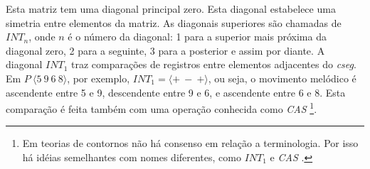 \documentclass[brazil]{article}
\newcommand{\termo}[1]{\textit{#1}}
\begin{document}
\begin{table}
  \centering
  \qquad
  \qquad
  \caption{Exemplos de \termo{COM-matrix}}
  \label{tab:matriz-exemplos}
\end{table}

Esta matriz tem uma diagonal principal zero. Esta diagonal estabelece
uma simetria entre elementos da matriz. As diagonais superiores são
chamadas de $INT_n$, onde $n$ é o número da diagonal: 1 para a
superior mais próxima da diagonal zero, 2 para a seguinte, 3 para a
posterior e assim por diante. A diagonal $INT_1$ traz comparações de
registros entre elementos adjacentes do \termo{cseg}. Em
$P\:\langle5\:9\:6\:8\rangle$, por exemplo,
$INT_1=\langle+\:-\:+\rangle$, ou seja, o movimento melódico é
ascendente entre 5 e 9, descendente entre 9 e 6, e ascendente entre 6
e 8. Esta comparação é feita também com uma operação conhecida como
\termo{CAS} \footnote{Em teorias de contornos não há consenso em
  relação a terminologia. Por isso há idéias semelhantes com nomes
  diferentes, como $INT_1$ e \termo{CAS}
  \cite{friedmann87:response}.}.
\end{document}
